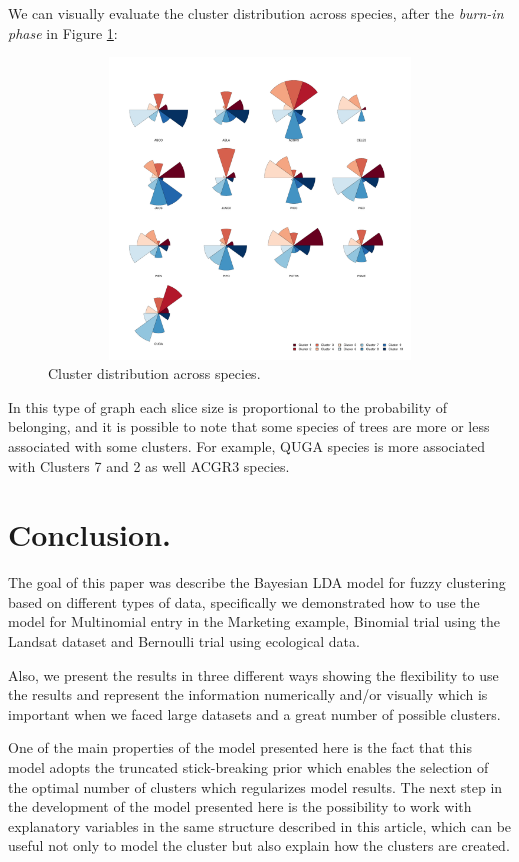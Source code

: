 \documentclass[article]{jss}
\begin{document}
We can visually evaluate the cluster distribution across species, after
the \emph{burn-in phase} in Figure \ref{figure:fig003}:

\newpage

\begin{figure}[htbp]
  \centering
  \includegraphics[width=12cm,height=8cm,keepaspectratio]{plot003.pdf}
  \caption{Cluster distribution across species.}
  \label{figure:fig003}
\end{figure}

In this type of graph each slice size is proportional to the probability
of belonging, and it is possible to note that some species of trees are
more or less associated with some clusters. For example, QUGA species is
more associated with Clusters 7 and 2 as well ACGR3 species.

\section{Conclusion.}\label{conclusion.}

The goal of this paper was describe the Bayesian LDA model for fuzzy
clustering based on different types of data, specifically we
demonstrated how to use the model for Multinomial entry in the Marketing
example, Binomial trial using the Landsat dataset and Bernoulli trial
using ecological data.

Also, we present the results in three different ways showing the
flexibility to use the results and represent the information numerically
and/or visually which is important when we faced large datasets and a
great number of possible clusters.

One of the main properties of the model presented here is the fact that
this model adopts the truncated stick-breaking prior which enables the
selection of the optimal number of clusters which regularizes model
results. The next step in the development of the model presented here is
the possibility to work with explanatory variables in the same structure
described in this article, which can be useful not only to model the
cluster but also explain how the clusters are created.
\end{document}
